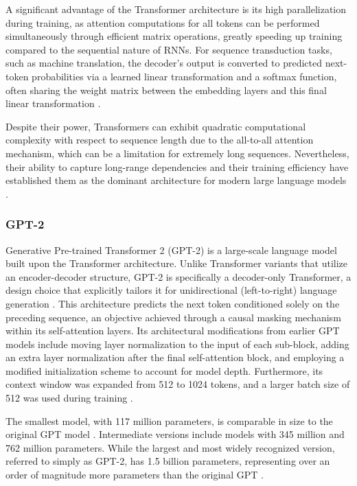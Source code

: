 A significant advantage of the Transformer architecture is its high parallelization during training, as attention computations for all tokens can be performed simultaneously through efficient matrix operations, greatly speeding up training compared to the sequential nature of RNNs. For sequence transduction tasks, such as machine translation, the decoder's output is converted to predicted next-token probabilities via a learned linear transformation and a softmax function, often sharing the weight matrix between the embedding layers and this final linear transformation \cite{jm3_llm_book}.

Despite their power, Transformers can exhibit quadratic computational complexity with respect to sequence length due to the all-to-all attention mechanism, which can be a limitation for extremely long sequences. Nevertheless, their ability to capture long-range dependencies and their training efficiency have established them as the dominant architecture for modern large language models \cite{jm3_llm_book}.
\subsubsection{GPT-2}

Generative Pre-trained Transformer 2 (GPT-2) is a large-scale language model built upon the Transformer architecture. Unlike Transformer variants that utilize an encoder-decoder structure, GPT-2 is specifically a decoder-only Transformer, a design choice that explicitly tailors it for unidirectional (left-to-right) language generation \cite{radford2019language}. This architecture predicts the next token conditioned solely on the preceding sequence, an objective achieved through a causal masking mechanism within its self-attention layers. Its architectural modifications from earlier GPT models include moving layer normalization to the input of each sub-block, adding an extra layer normalization after the final self-attention block, and employing a modified initialization scheme to account for model depth. Furthermore, its context window was expanded from 512 to 1024 tokens, and a larger batch size of 512 was used during training \cite{radford2019language}.

The smallest model, with 117 million parameters, is comparable in size to the original GPT model \cite{radford2019language}. Intermediate versions include models with 345 million and 762 million parameters. While the largest and most widely recognized version, referred to simply as GPT-2, has 1.5 billion parameters, representing over an order of magnitude more parameters than the original GPT \cite{jm3_llm_book, radford2019language}. 

